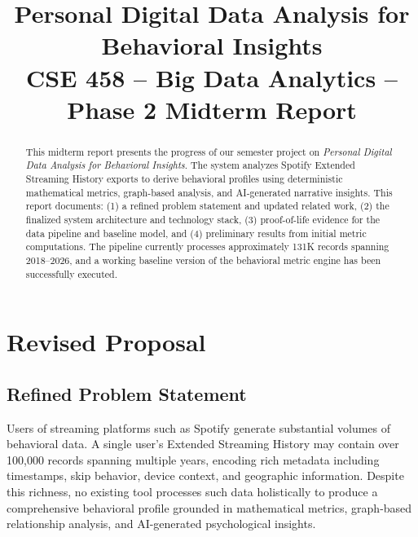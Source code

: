 \documentclass[conference]{IEEEtran}
\begin{document}
\title{Personal Digital Data Analysis for Behavioral Insights\\
{\large CSE 458 -- Big Data Analytics -- Phase 2 Midterm Report}}

\author{
}

\maketitle

\begin{abstract}
This midterm report presents the progress of our semester project on \textit{Personal Digital Data Analysis for Behavioral Insights}. The system analyzes Spotify Extended Streaming History exports to derive behavioral profiles using deterministic mathematical metrics, graph-based analysis, and AI-generated narrative insights. This report documents: (1) a refined problem statement and updated related work, (2) the finalized system architecture and technology stack, (3) proof-of-life evidence for the data pipeline and baseline model, and (4) preliminary results from initial metric computations. The pipeline currently processes approximately 131K records spanning 2018--2026, and a working baseline version of the behavioral metric engine has been successfully executed.
\end{abstract}

\section{Revised Proposal}

\subsection{Refined Problem Statement}

Users of streaming platforms such as Spotify generate substantial volumes of behavioral data. A single user's Extended Streaming History may contain over 100{,}000 records spanning multiple years, encoding rich metadata including timestamps, skip behavior, device context, and geographic information. Despite this richness, no existing tool processes such data holistically to produce a comprehensive behavioral profile grounded in mathematical metrics, graph-based relationship analysis, and AI-generated psychological insights.
\end{document}
